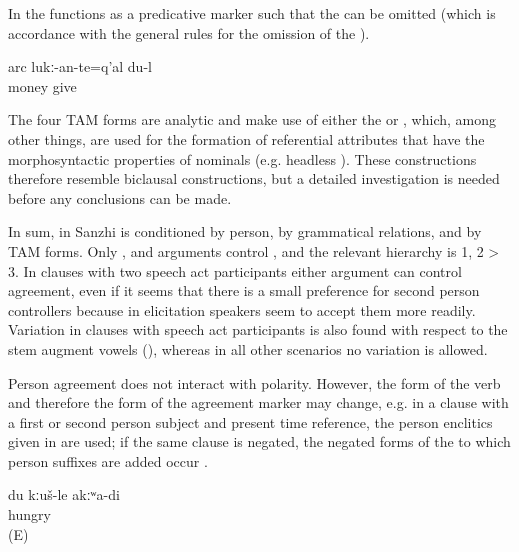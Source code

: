 In  the   functions as a predicative marker such that the  can be omitted (which is accordance with the general rules for the omission of the ).
 
 
\begin{exe}

	\ex	\label{ex:‎‎‎I have to give the money back}
	\gll	arc	lukː-an-te=q'al	du-l\\
		money	give	\\
	\glt	{}
\end{exe}


The four TAM forms are analytic and make use of either the   or , which, among other things, are used for the formation of referential attributes that have the morphosyntactic properties of nominals (e.g. headless ). These constructions therefore resemble biclausal constructions, but a detailed investigation is needed before any conclusions can be made.



In sum,  in Sanzhi is conditioned by person, by grammatical relations, and by TAM forms. Only ,  and  arguments control , and the relevant hierarchy is 1, 2 > 3. In clauses with two speech act participants either argument can control agreement, even if it seems that there is a small preference for second person controllers because in elicitation speakers seem to accept them more readily. Variation in clauses with speech act participants is also found with respect to the stem augment vowels (), whereas in all other scenarios no variation is allowed.


Person agreement does not interact with polarity. However, the form of the verb and therefore the form of the agreement marker may change, e.g. in a  clause with a first or second person subject and present time reference, the person enclitics given in  are used; if the same clause is negated, the negated forms of the  to which person suffixes are added occur . 
%
\begin{exe}
	\ex	\label{ex:I am not hungry@24}
	\gll	du	kːuš-le	akːʷa-di\\
			hungry	\\
	\glt	{} (E)
\end{exe}

